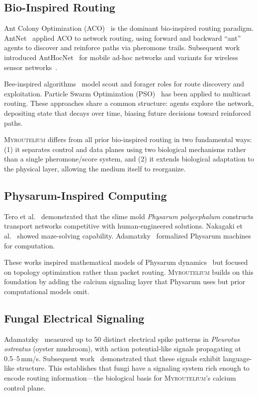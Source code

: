 \documentclass[conference,10pt]{IEEEtran}
\newcommand{\myc}{\textsc{Myroutelium}}
\begin{document}
\subsection{Bio-Inspired Routing}

Ant Colony Optimization (ACO)~\cite{dorigo2004} is the dominant bio-inspired routing paradigm. AntNet~\cite{dicaro1998} applied ACO to network routing, using forward and backward ``ant'' agents to discover and reinforce paths via pheromone trails. Subsequent work introduced AntHocNet~\cite{dicaro2005} for mobile ad-hoc networks and variants for wireless sensor networks~\cite{saleem2011}.

Bee-inspired algorithms~\cite{wedde2004} model scout and forager roles for route discovery and exploitation. Particle Swarm Optimization (PSO)~\cite{kennedy1995} has been applied to multicast routing. These approaches share a common structure: agents explore the network, depositing state that decays over time, biasing future decisions toward reinforced paths.

\myc{} differs from all prior bio-inspired routing in two fundamental ways: (1) it separates control and data planes using two biological mechanisms rather than a single pheromone/score system, and (2) it extends biological adaptation to the physical layer, allowing the medium itself to reorganize.

\subsection{Physarum-Inspired Computing}

Tero et al.~\cite{tero2010} demonstrated that the slime mold \emph{Physarum polycephalum} constructs transport networks competitive with human-engineered solutions. Nakagaki et al.~\cite{nakagaki2000} showed maze-solving capability. Adamatzky~\cite{adamatzky2010} formalized Physarum machines for computation.

These works inspired mathematical models of Physarum dynamics~\cite{bonifaci2012} but focused on topology optimization rather than packet routing. \myc{} builds on this foundation by adding the calcium signaling layer that Physarum uses but prior computational models omit.

\subsection{Fungal Electrical Signaling}

Adamatzky~\cite{adamatzky2018} measured up to 50 distinct electrical spike patterns in \emph{Pleurotus ostreatus} (oyster mushroom), with action potential-like signals propagating at 0.5--5\,mm/s. Subsequent work~\cite{adamatzky2022} demonstrated that these signals exhibit language-like structure. This establishes that fungi have a signaling system rich enough to encode routing information---the biological basis for \myc{}'s calcium control plane.
\end{document}
